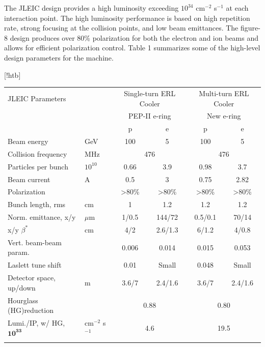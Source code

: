 The JLEIC design provides a high luminosity exceeding $10^{34}$ cm$^{-2}$ s$^{-1}$ at each interaction point. The high luminosity performance is based on high repetition rate, strong focusing at the collision points, and low beam emittances. The figure-8 design produces over 80\% polarization for both the electron and ion beams and allows for efficient polarization control. Table 1 summarizes some of the high-level design parameters for the machine.

\begin{center}[!htb]
	\begin{tabular}{ l l c c c c } 
		JLEIC Parameters & & \multicolumn{2}{c}{Single-turn ERL Cooler} & \multicolumn{2}{c}{Multi-turn ERL Cooler}\\ 
		& & \multicolumn{2}{c}{PEP-II e-ring} & \multicolumn{2}{c}{New e-ring} \\
		\hline \hline
		& & p & e & p & e\\
		\hline
		Beam energy & GeV & 100 & 5 &100 &5 \\ 
		Collision frequency & MHz& \multicolumn{2}{c}{476} & \multicolumn{2}{c}{476}\\ 
		Particles per bunch & $10^10$ & 0.66 & 3.9& 0.98 & 3.7\\
		Beam current & A & 0.5 & 3 & 0.75 & 2.82\\
		Polarization &  & \textgreater80\% & \textgreater80\% & \textgreater80\% & \textgreater80\%\\
		Bunch length, rms & cm & 1 & 1.2 & 1.2 & 1.2 \\
		Norm. emittance, x/y& $\mu$m & 1/0.5 & 144/72 & 0.5/0.1 & 70/14 \\
		x/y $\beta^*$ & cm &4/2 & 2.6/1.3 & 6/1.2 & 4/0.8\\
		Vert. beam-beam param.& & 0.006 & 0.014 & 0.015 & 0.053\\
		Laslett tune shift & & 0.01 & Small & 0.048 & Small\\
		Detector space, up/down & m & 3.6/7 & 2.4/1.6 & 3.6/7 & 2.4/1.6\\
		Hourglass (HG)reduction & & \multicolumn{2}{c}{0.88} & \multicolumn{2}{c}{0.80}\\
		Lumi./IP, w/ HG, $\mathbf{10^{33}}$ & cm$^{-2}$ s$^{-1}$ & \multicolumn{2}{c}{4.6} & \multicolumn{2}{c}{19.5} \\
		\hline
		\label{table:parameters}
	\end{tabular}
\end{center}

